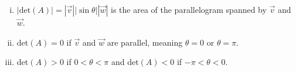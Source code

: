\documentclass[a4paper,11pt]{article}
\begin{document}
\begin{outline}
    \begin{enumerate}[i.]
      \item 
        \(|\text{det}(A)|=|\vec{v}||\sin{\theta}||\vec{w}|\) is the area of the parallelogram spanned by
        \(\vec{v}\) and \(\vec{w}\).
      \item 
        \(\text{det}(A) = 0\) if \(\vec{v}\) and \(\vec{w}\) are parallel, meaning \(\theta = 0\) or
        \(\theta = \pi\).
      \item
        \(\text{det}(A) > 0\) if \(0 < \theta < \pi\) and \(\text{det}(A) < 0\) if \(-\pi < \theta < 0\).
    \end{enumerate}
    
\end{outline}
      
\end{document}
